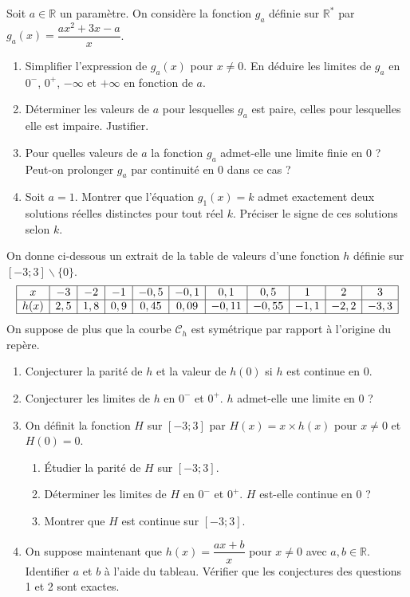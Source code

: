 \documentclass[11pt]{article}
\def\setminus{\mathbin{\backslash}}\let\smallsetminus\setminus
\begin{document}
\begin{exercice}
Soit $a \in \mathbb{R}$ un paramètre. On considère la fonction $g_a$ définie sur $\mathbb{R}^*$ par $g_a(x) = \dfrac{ax^2 + 3x - a}{x}$.
\begin{enumerate}
    \item Simplifier l'expression de $g_a(x)$ pour $x \neq 0$. En déduire les limites de $g_a$ en $0^-$, $0^+$, $-\infty$ et $+\infty$ en fonction de $a$.
    \item Déterminer les valeurs de $a$ pour lesquelles $g_a$ est paire, celles pour lesquelles elle est impaire. Justifier.
    \item Pour quelles valeurs de $a$ la fonction $g_a$ admet-elle une limite finie en $0$ ? Peut-on prolonger $g_a$ par continuité en $0$ dans ce cas ?
    \item Soit $a=1$. Montrer que l'équation $g_1(x) = k$ admet exactement deux solutions réelles distinctes pour tout réel $k$. Préciser le signe de ces solutions selon $k$.
\end{enumerate}
\end{exercice}

\begin{exercice}
On donne ci-dessous un extrait de la table de valeurs d'une fonction $h$ définie sur $[-3; 3] \setminus \{0\}$.
\[
\begin{array}{|c|c|c|c|c|c|c|c|c|c|c|}
\hline
x & -3 & -2 & -1 & -0,5 & -0,1 & 0,1 & 0,5 & 1 & 2 & 3 \\
\hline
h(x) & 2,5 & 1,8 & 0,9 & 0,45 & 0,09 & -0,11 & -0,55 & -1,1 & -2,2 & -3,3 \\
\hline
\end{array}
\]
On suppose de plus que la courbe $\mathcal{C}_h$ est symétrique par rapport à l'origine du repère.
\begin{enumerate}
    \item Conjecturer la parité de $h$ et la valeur de $h(0)$ si $h$ est continue en $0$.
    \item Conjecturer les limites de $h$ en $0^-$ et $0^+$. $h$ admet-elle une limite en $0$ ?
    \item On définit la fonction $H$ sur $[-3; 3]$ par $H(x) = x \times h(x)$ pour $x \neq 0$ et $H(0)=0$.
    \begin{enumerate}
        \item Étudier la parité de $H$ sur $[-3; 3]$.
        \item Déterminer les limites de $H$ en $0^-$ et $0^+$. $H$ est-elle continue en $0$ ?
        \item Montrer que $H$ est continue sur $[-3; 3]$.
    \end{enumerate}
    \item On suppose maintenant que $h(x) = \dfrac{ax+b}{x}$ pour $x \neq 0$ avec $a,b \in \mathbb{R}$. Identifier $a$ et $b$ à l'aide du tableau. Vérifier que les conjectures des questions 1 et 2 sont exactes.
\end{enumerate}
\end{exercice}
\end{document}
